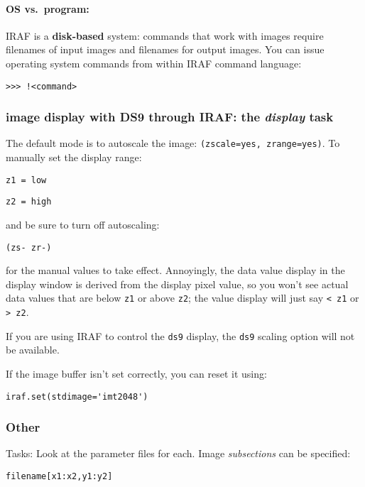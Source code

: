 \documentclass{article}
\begin{document}
\paragraph{OS vs.\ program:}
IRAF is a \textbf{disk-based} system: commands that work with images require
filenames of input images and filenames for output images.
You can issue operating system commands from within IRAF command
language:
\begin{list}{}
    \item \verb|>>> !<command>|
\end{list}

\subsubsection*{image display with DS9 through IRAF: the
\emph{display} task}

The default mode is to autoscale the image:
\verb|(zscale=yes, zrange=yes)|.
To manually set the display range:
\begin{list}{}
\item \verb|z1 = low|
\item \verb|z2 = high|
\end{list}
and be sure to turn off autoscaling:
\begin{list}{}
\item \verb|(zs- zr-)|
\end{list}
for the manual values to take effect.
Annoyingly, the data value display in the display window is derived from
the display pixel value, so you won't see actual data values that are
below \verb|z1| or above \verb|z2|; the value display will just say
\verb|< z1| or \verb|> z2|.

If you are using IRAF to control the \verb|ds9| display, the \verb|ds9|
scaling option will not be available.

If the image buffer isn't set correctly, you can reset it using:
\begin{list}{}
\item \verb|iraf.set(stdimage='imt2048')|
\end{list}

\subsubsection*{Other}

Tasks:
Look at the parameter files for each.
Image \emph{subsections} can be specified:
\begin{list}{}
\item \verb|filename[x1:x2,y1:y2]|
\end{list}
\end{document}
